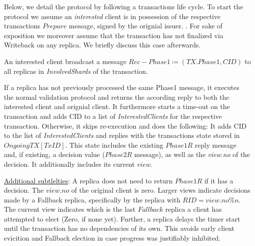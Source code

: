 Below, we detail the protocol by following a transactions life cycle. To start the protocol we assume an \textit{interested} client is in possession of the respective transactions $Prepare$ message, signed by the orignial issuer. . For sake of exposition we moreover assume that the transaction has not finalized via Writeback on any replica. We briefly discuss this case afterwards.  




An interested client broadcast a message $Rec-Phase1 \coloneqq (TX.Phase1, CID)$ to all replicas in \textit{InvolvedShards} of the transaction. 

If a replica has not previously processed the same Phase1 message, it executes the normal validation protocol and returns the according reply to both the interested client and orignial client. It furthermore starts a time-out on the transaction and adds CID to a list of \textit{InterestedClients} for the respective transaction.
Otherwise, it skips re-execution and does the following: It adds CID to the list of \textit{InterestedClients} and replies with the transactions state stored in $OngoingTX[TxID]$. This state includes the existing $Phase1R$ reply message and, if existing, a decision value ($Phase2R$ message), as well as the \textit{view.no} of the decision. It additionally includes its current $view$.

\underline{Additional subtlelties}: A replica does not need to return $Phase1R$ if it has a decision. The $view.no$ of the original client is zero. Larger views indicate decisions made by a Fallback replica, specifically by the replica with $RID = view.no \% n$. The current view indicates which is the last $Fallback$ replica a client has attempted to elect (Zero, if none yet). Further, a replica delays the timer start until the transaction has no dependencies of its own. This avoids early client evicition and Fallback election in case progress was justifiably inhibited. 

